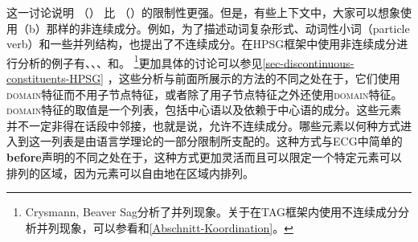 这一讨论说明 （） 比 （）的限制性更强。但是，有些上下文中，大家可以想象使用（b）那样的非连续成分。例如，为了描述动词复杂形式、动词性小词（particle verb）和一些并列结构，也提出了不连续成分\citep{Wells47a}。在HPSG\indexhpsgc 框架中使用非连续成分进行分析的例子有、、、和。 \footnote{
Crysmann, Beaver \biband Sag分析了并列现象。关于在TAG\indextagc 框架内使用不连续成分分析并列现象，可以参看和\ref{Abschnitt-Koordination}。%
	}更加具体的讨论可以参见\ref{sec-discontinuous-constituents-HPSG} ，这些分析与前面所展示的方法的不同之处在于，它们使用\textsc{domain}特征而不用子节点特征，或者除了用子节点特征之外还使用\textsc{domain}特征。\textsc{domain}特征的取值是一个列表，包括中心语以及依赖于中心语的成分。这些元素并不一定非得在话段中邻接，也就是说，允许不连续成分。哪些元素以何种方式进入到这一列表是由语言学理论的一部分限制所支配的。这种方式与ECG中简单的\textbf{before}声明的不同之处在于，这种方式更加灵活而且可以限定一个特定元素可以排列的区域，因为元素可以自由地在区域内排列。

